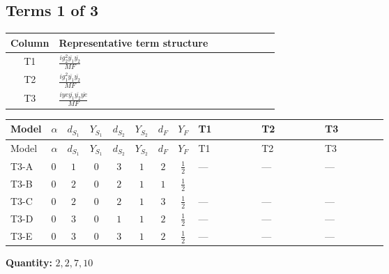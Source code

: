 \documentclass[8pt]{article}
\begin{document}
\begin{landscape}
\subsection*{Terms 1 of 3}
\begin{center}
\begin{tabular}{@{}c >{\raggedright\arraybackslash}p{0.82\linewidth}@{}}
\toprule
Column & Representative term structure \\
\midrule
T1 & \(\displaystyle \frac{i g_{2}^{2} \overline{y_{1}} \overline{y_{2}}}{MF}\) \\
\midrule
T2 & \(\displaystyle \frac{i g_{1}^{2} \overline{y_{1}} \overline{y_{2}}}{MF}\) \\
\midrule
T3 & \(\displaystyle \frac{i ye \overline{y_{1}} \overline{y_{2}} \overline{ye}}{MF}\) \\
\midrule
\bottomrule
\end{tabular}
\end{center}
\smallskip
\tiny
\begin{longtable}{@{}llcccccc >{\raggedright\arraybackslash}p{0.21\linewidth} >{\raggedright\arraybackslash}p{0.21\linewidth} >{\raggedright\arraybackslash}p{0.21\linewidth}@{}}
\toprule
Model & $\alpha$ & $d_{S_1}$ & $Y_{S_1}$ & $d_{S_2}$ & $Y_{S_2}$ & $d_F$ & $Y_F$ & T1 & T2 & T3 \\
\midrule
\endfirsthead
\toprule
Model & $\alpha$ & $d_{S_1}$ & $Y_{S_1}$ & $d_{S_2}$ & $Y_{S_2}$ & $d_F$ & $Y_F$ & T1 & T2 & T3 \\
\midrule
\endhead
T3-A & $0$ & $1$ & $0$ & $3$ & $1$ & $2$ & $\frac{1}{2}$ & --- & --- & --- \\
\midrule
T3-B & $0$ & $2$ & $0$ & $2$ & $1$ & $1$ & $\frac{1}{2}$ & \scriptsize\adjustbox{max width=\linewidth}{$\begin{gathered} \frac{3 i g_{2}^{2} \overline{y_{1}} \overline{y_{2}}}{4 MF}\end{gathered}$} & \scriptsize\adjustbox{max width=\linewidth}{$\begin{gathered} \frac{3 i g_{1}^{2} \overline{y_{1}} \overline{y_{2}}}{8 MF}\end{gathered}$} & \scriptsize\adjustbox{max width=\linewidth}{$\begin{gathered} - \frac{i ye \overline{y_{1}} \overline{y_{2}} \overline{ye}}{4 MF}\end{gathered}$} \\
\midrule
T3-C & $0$ & $2$ & $0$ & $2$ & $1$ & $3$ & $\frac{1}{2}$ & --- & --- & --- \\
\midrule
T3-D & $0$ & $3$ & $0$ & $1$ & $1$ & $2$ & $\frac{1}{2}$ & --- & --- & --- \\
\midrule
T3-E & $0$ & $3$ & $0$ & $3$ & $1$ & $2$ & $\frac{1}{2}$ & --- & --- & --- \\
\midrule
\bottomrule
\end{longtable}
\clearpage
\noindent\textbf{Quantity: }$\mathrm{2,2,7,10}$\par\smallskip

\end{landscape}
\end{document}
